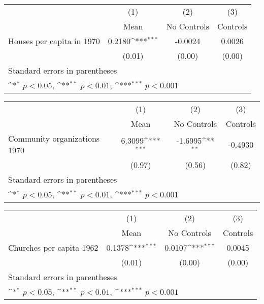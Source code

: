 {
\def\sym#1{\ifmmode^{#1}\else\(^{#1}\)\fi}
\begin{tabular}{l*{3}{c}}
\hline\hline
                    &\multicolumn{1}{c}{(1)}&\multicolumn{1}{c}{(2)}&\multicolumn{1}{c}{(3)}\\
                    &\multicolumn{1}{c}{Mean}&\multicolumn{1}{c}{No Controls}&\multicolumn{1}{c}{Controls}\\
\hline
Houses per capita in 1970&      0.2180\sym{***}&     -0.0024         &      0.0026         \\
                    &      (0.01)         &      (0.00)         &      (0.00)         \\
\hline\hline
\multicolumn{4}{l}{\footnotesize Standard errors in parentheses}\\
\multicolumn{4}{l}{\footnotesize \sym{*} \(p<0.05\), \sym{**} \(p<0.01\), \sym{***} \(p<0.001\)}\\
\end{tabular}
}
{
\def\sym#1{\ifmmode^{#1}\else\(^{#1}\)\fi}
\begin{tabular}{l*{3}{c}}
\hline\hline
                    &\multicolumn{1}{c}{(1)}&\multicolumn{1}{c}{(2)}&\multicolumn{1}{c}{(3)}\\
                    &\multicolumn{1}{c}{Mean}&\multicolumn{1}{c}{No Controls}&\multicolumn{1}{c}{Controls}\\
\hline
Community organizations 1970&      6.3099\sym{***}&     -1.6995\sym{**} &     -0.4930         \\
                    &      (0.97)         &      (0.56)         &      (0.82)         \\
\hline\hline
\multicolumn{4}{l}{\footnotesize Standard errors in parentheses}\\
\multicolumn{4}{l}{\footnotesize \sym{*} \(p<0.05\), \sym{**} \(p<0.01\), \sym{***} \(p<0.001\)}\\
\end{tabular}
}
{
\def\sym#1{\ifmmode^{#1}\else\(^{#1}\)\fi}
\begin{tabular}{l*{3}{c}}
\hline\hline
                    &\multicolumn{1}{c}{(1)}&\multicolumn{1}{c}{(2)}&\multicolumn{1}{c}{(3)}\\
                    &\multicolumn{1}{c}{Mean}&\multicolumn{1}{c}{No Controls}&\multicolumn{1}{c}{Controls}\\
\hline
Churches per capita 1962&      0.1378\sym{***}&      0.0107\sym{***}&      0.0045         \\
                    &      (0.01)         &      (0.00)         &      (0.00)         \\
\hline\hline
\multicolumn{4}{l}{\footnotesize Standard errors in parentheses}\\
\multicolumn{4}{l}{\footnotesize \sym{*} \(p<0.05\), \sym{**} \(p<0.01\), \sym{***} \(p<0.001\)}\\
\end{tabular}
}
